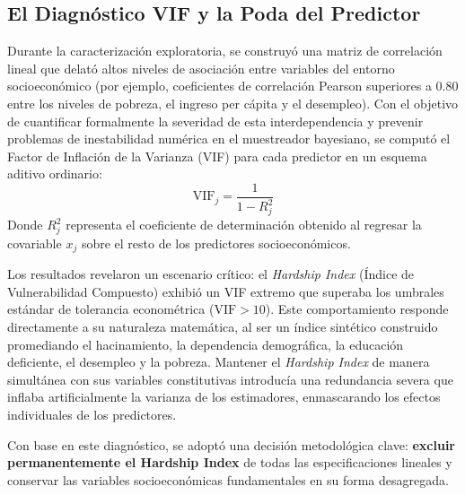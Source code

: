\documentclass[11pt,a4paper]{article}
\begin{document}
\subsection{El Diagnóstico VIF y la Poda del Predictor}
Durante la caracterización exploratoria, se construyó una matriz de correlación lineal que delató altos niveles de asociación entre variables del entorno socioeconómico (por ejemplo, coeficientes de correlación Pearson superiores a $0.80$ entre los niveles de pobreza, el ingreso per cápita y el desempleo). Con el objetivo de cuantificar formalmente la severidad de esta interdependencia y prevenir problemas de inestabilidad numérica en el muestreador bayesiano, se computó el Factor de Inflación de la Varianza (VIF) para cada predictor en un esquema aditivo ordinario:
\begin{equation}
    \text{VIF}_j = \frac{1}{1 - R_j^2}
\end{equation}
Donde $R_j^2$ representa el coeficiente de determinación obtenido al regresar la covariable $x_j$ sobre el resto de los predictores socioeconómicos. 

Los resultados revelaron un escenario crítico: el \textit{Hardship Index} (Índice de Vulnerabilidad Compuesto) exhibió un VIF extremo que superaba los umbrales estándar de tolerancia econométrica ($\text{VIF} > 10$). Este comportamiento responde directamente a su naturaleza matemática, al ser un índice sintético construido promediando el hacinamiento, la dependencia demográfica, la educación deficiente, el desempleo y la pobreza. Mantener el \textit{Hardship Index} de manera simultánea con sus variables constitutivas introducía una redundancia severa que inflaba artificialmente la varianza de los estimadores, enmascarando los efectos individuales de los predictores.

Con base en este diagnóstico, se adoptó una decisión metodológica clave: \textbf{excluir permanentemente el Hardship Index} de todas las especificaciones lineales y conservar las variables socioeconómicas fundamentales en su forma desagregada.
\end{document}
